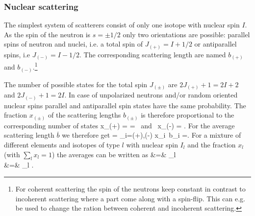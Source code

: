 \subsubsection{Nuclear scattering}
The simplest system of scatterers consist of only one isotope with nuclear spin $I$.
As the spin of the neutron is $s = \pm 1/2$ only two orientations are possible: parallel
spins of neutron and nuclei, i.e. a total spin of $J_{(+)}=I+1/2$ or antiparallel spins,
i.e $J_{(-)}=I-1/2$.  The corresponding scattering length are named $b_{(+)}$ and
$b_{(-)}$.\footnote{For coherent scattering the spin of the neutrons keep constant in
contrast to incoherent scattering where a part come along with a spin-flip. This can e.g.
be used to change the ration between coherent and incoherent scattering.}

The number of possible states for the total spin $J_{(\pm)}$ are
$2J_{(+)}+1 = 2I+2$ and $2J_{(-)}+1 = 2I$. In case of unpolarized neutrons and/or
random oriented nuclear spins parallel and antiparallel spin states have the same
probability. The fraction $x_{(\pm)}$ of the scattering lengths $b_{(\pm)}$
is therefore proportional to the corresponding number of states
\BE
x_{(+)} = 
=  \mbox{~and~} x_{(-)} =  \quad .
\EE
For the average scattering length $\overline{b}$ we therefore get
\BE
{} = \sum_{i=(+),(-)} x_i\, b_i =\left[ (I+1)\, b_{(+)}
+ I\, b_{(-)} \right] \quad .
\EE
For a mixture of different elements and isotopes of type $l$ with nuclear spin $I_l$
and the fraction  $x_l$ (with $\sum_l x_l = 1$) the averages can be written as
\BEA
{} &=& \sum_l  \left[ (I_l+1)\, b_{l(+)}
+ I_l\, b_{l(-)} \right]  \\
 &=& \sum_l   \quad .
\EEA

